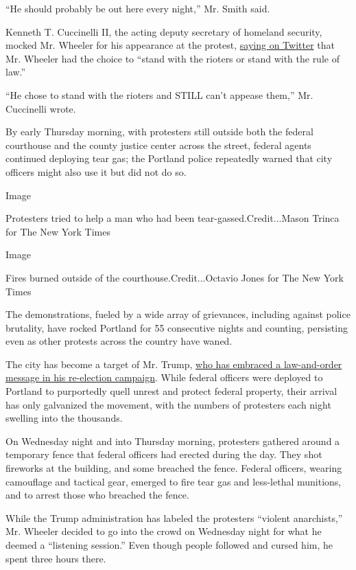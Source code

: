 ``He should probably be out here every night,'' Mr. Smith said.

Kenneth T. Cuccinelli II, the acting deputy secretary of homeland
security, mocked Mr. Wheeler for his appearance at the protest,
\href{https://twitter.com/HomelandKen/status/1286361863433879552?s=20}{saying
on Twitter} that Mr. Wheeler had the choice to ``stand with the rioters
or stand with the rule of law.''

``He chose to stand with the rioters and STILL can't appease them,'' Mr.
Cuccinelli wrote.

By early Thursday morning, with protesters still outside both the
federal courthouse and the county justice center across the street,
federal agents continued deploying tear gas; the Portland police
repeatedly warned that city officers might also use it but did not do
so.

Image

Protesters tried to help a man who had been tear-gassed.Credit...Mason
Trinca for The New York Times

Image

Fires burned outside of the courthouse.Credit...Octavio Jones for The
New York Times

The demonstrations, fueled by a wide array of grievances, including
against police brutality, have rocked Portland for 55 consecutive nights
and counting, persisting even as other protests across the country have
waned.

The city has become a target of Mr. Trump,
\href{https://www.nytimes3xbfgragh.onion/2020/07/21/us/politics/trump-portland-federal-agents.html}{who
has embraced a law-and-order message in his re-election campaign}. While
federal officers were deployed to Portland to purportedly quell unrest
and protect federal property, their arrival has only galvanized the
movement, with the numbers of protesters each night swelling into the
thousands.

On Wednesday night and into Thursday morning, protesters gathered around
a temporary fence that federal officers had erected during the day. They
shot fireworks at the building, and some breached the fence. Federal
officers, wearing camouflage and tactical gear, emerged to fire tear gas
and less-lethal munitions, and to arrest those who breached the fence.

While the Trump administration has labeled the protesters ``violent
anarchists,'' Mr. Wheeler decided to go into the crowd on Wednesday
night for what he deemed a ``listening session.'' Even though people
followed and cursed him, he spent three hours there.

